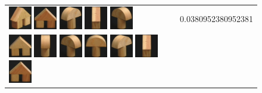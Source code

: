 {\begin{figure}[p]
\begin{tabular}{m{11cm} | m{3cm} |}
\includegraphics[width=1cm]{coil/beeld-45.eps}
\includegraphics[width=1cm]{coil/beeld-43.eps}
\includegraphics[width=1cm]{coil/beeld-3.eps}
\includegraphics[width=1cm]{coil/beeld-47.eps}
\includegraphics[width=1cm]{coil/beeld-4.eps}
& {\scriptsize 0.0380952380952381}
\\
\includegraphics[width=1cm]{coil/beeld-42.eps}
\includegraphics[width=1cm]{coil/beeld-5.eps}
\includegraphics[width=1cm]{coil/beeld-4.eps}
\includegraphics[width=1cm]{coil/beeld-1.eps}
\includegraphics[width=1cm]{coil/beeld-3.eps}
\includegraphics[width=1cm]{coil/beeld-47.eps}
\includegraphics[width=1cm]{coil/beeld-43.eps}

\end{tabular}
\end{figure}}
